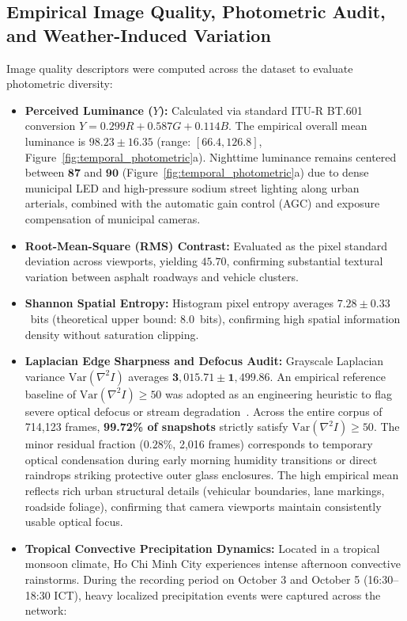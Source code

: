 \documentclass[preprint,12pt]{elsarticle}
\begin{document}
\subsection{Empirical Image Quality, Photometric Audit, and Weather-Induced Variation}
Image quality descriptors were computed across the dataset to evaluate photometric diversity:
\begin{itemize}
    \item \textbf{Perceived Luminance ($Y$):} Calculated via standard ITU-R BT.601 conversion $Y = 0.299R + 0.587G + 0.114B$. The empirical overall mean luminance is $\mathbf{98.23 \pm 16.35}$ (range: $[66.4, 126.8]$, Figure~\ref{fig:temporal_photometric}a). Nighttime luminance remains centered between $\mathbf{87}$ and $\mathbf{90}$ (Figure~\ref{fig:temporal_photometric}a) due to dense municipal LED and high-pressure sodium street lighting along urban arterials, combined with the automatic gain control (AGC) and exposure compensation of municipal cameras.
    \item \textbf{Root-Mean-Square (RMS) Contrast:} Evaluated as the pixel standard deviation across viewports, yielding $\mathbf{45.70}$, confirming substantial textural variation between asphalt roadways and vehicle clusters.
    \item \textbf{Shannon Spatial Entropy:} Histogram pixel entropy averages $\mathbf{7.28 \pm 0.33}$~bits (theoretical upper bound: $8.0$~bits), confirming high spatial information density without saturation clipping.
    \item \textbf{Laplacian Edge Sharpness and Defocus Audit:} Grayscale Laplacian variance $\text{Var}(\nabla^2 I)$ averages $\mathbf{3,015.71 \pm 1,499.86}$. An empirical reference baseline of $\text{Var}(\nabla^2 I) \ge 50$ was adopted as an engineering heuristic to flag severe optical defocus or stream degradation~\cite{pech2000diatom}. Across the entire corpus of 714,123 frames, \textbf{99.72\% of snapshots} strictly satisfy $\text{Var}(\nabla^2 I) \ge 50$. The minor residual fraction ($0.28\%$, 2,016 frames) corresponds to temporary optical condensation during early morning humidity transitions or direct raindrops striking protective outer glass enclosures. The high empirical mean reflects rich urban structural details (vehicular boundaries, lane markings, roadside foliage), confirming that camera viewports maintain consistently usable optical focus.
    \item \textbf{Tropical Convective Precipitation Dynamics:} Located in a tropical monsoon climate, Ho Chi Minh City experiences intense afternoon convective rainstorms. During the recording period on October 3 and October 5 (16:30--18:30 ICT), heavy localized precipitation events were captured across the network:

\end{itemize}
\end{document}

